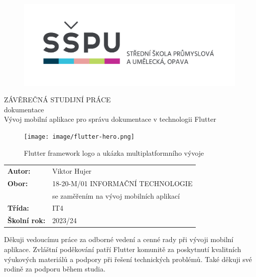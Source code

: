 \documentclass[12pt, a4paper,
twoside,        %
openright
]{report}
\title{\nazevPrace}
\author{\jmenoAutora}
\date{\datumOdevzdani}
\newcommand\obor{INFORMAČNÍ TECHNOLOGIE} %
\newcommand\kodOboru{18-20-M/01} %
\newcommand\zamereni{se zaměřením na vývoj mobilních aplikací} %
\newcommand\trida{IT4} %
\newcommand\jmenoAutora{Viktor Hujer}  %
\newcommand\skolniRok{2023/24} %
\newcommand\nazevPrace{Vývoj mobilní aplikace pro správu dokumentace v technologii Flutter} %
\begin{document}
\pagestyle{empty}
\cleardoublepage

{\selectfont
\begin{figure}[h]
    \centering
    \includegraphics[width=0.6\linewidth]{image/logo-skoly.png}
\end{figure}

{\bfseries
\begin{center}
    \vspace{0.025 \textheight}
    \LARGE{ZÁVĚREČNÁ STUDIJNÍ PRÁCE}\\
    \large{dokumentace}\\
    \vspace{0.075 \textheight}
    \LARGE {\nazevPrace}\\
\end{center}
}

\begin{figure}[h]
    \centering
    \texttt{[image: image/flutter-hero.png]}
    \caption{Flutter framework logo a ukázka multiplatformního vývoje \cite{flutterDev}}
\end{figure}

\vspace{0.02 \textheight}
\begin{table}[h!]
    \begin{tabular}{ll}
        \textbf{Autor:} & \jmenoAutora\\
        \textbf{Obor:} & \kodOboru { } \obor\\
        \textbf{} & \zamereni\\
        \textbf{Třída:} & \trida\\
        \textbf{Školní rok:} & \skolniRok\\
    \end{tabular}
\end{table}
}

\cleardoublepage

\noindent Děkuji vedoucímu práce za odborné vedení a cenné rady při vývoji mobilní aplikace. Zvláštní poděkování patří Flutter komunitě za poskytnutí kvalitních výukových materiálů a podpory při řešení technických problémů. Také děkuji své rodině za podporu během studia.
\end{document}
